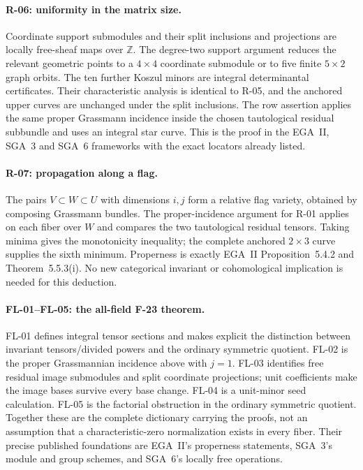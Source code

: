 \paragraph{R-06: uniformity in the matrix size.}
Coordinate support submodules and their split inclusions
and projections are locally free-sheaf maps over
$\mathbb Z$. The degree-two support argument reduces
the relevant geometric points to a $4\times4$ coordinate
submodule or to five finite $5\times2$ graph orbits.
The ten further Koszul minors are integral determinantal
certificates. Their characteristic analysis is identical
to R-05, and the anchored upper curves are unchanged
under the split inclusions. The row assertion applies
the same proper Grassmann incidence inside the chosen
tautological residual subbundle and uses an integral
star curve. This is the proof in the EGA~II, SGA~3 and
SGA~6 frameworks with the exact locators already listed.

\paragraph{R-07: propagation along a flag.}
The pairs $V\subset W\subset U$ with dimensions $i,j$
form a relative flag variety, obtained by composing
Grassmann bundles. The proper-incidence argument for
R-01 applies on each fiber over $W$ and compares the
two tautological residual tensors. Taking minima gives
the monotonicity inequality; the complete anchored
$2\times3$ curve supplies the sixth minimum. Properness
is exactly EGA~II Proposition~5.4.2 and
Theorem~5.5.3(i). No new categorical invariant or
cohomological implication is needed for this deduction.

\paragraph{FL-01--FL-05: the all-field F-23 theorem.}
FL-01 defines integral tensor sections and makes explicit
the distinction between invariant tensors/divided powers
and the ordinary symmetric quotient. FL-02 is the
proper Grassmannian incidence above with $j=1$.
FL-03 identifies free residual image submodules and
split coordinate projections; unit coefficients
make the image bases survive every base change.
FL-04 is a unit-minor seed calculation. FL-05 is
the factorial obstruction in the ordinary symmetric
quotient. Together these are the complete dictionary
carrying the proofs, not an assumption that a
characteristic-zero normalization exists in every
fiber. Their precise published foundations are
EGA~II's properness statements, SGA~3's module and
group schemes, and SGA~6's locally free operations.

